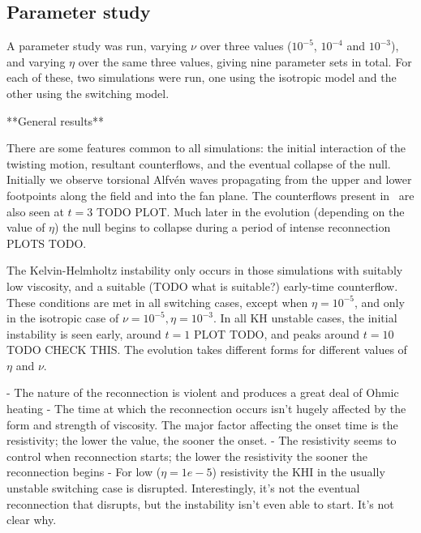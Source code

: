 \subsection{Parameter study}

A parameter study was run, varying $\nu$ over three values ($10^{-5}$, $10^{-4}$ and $10^{-3}$), and varying $\eta$ over the same three values, giving nine parameter sets in total. For each of these, two simulations were run, one using the isotropic model and the other using the switching model.

**General results**

There are some features common to all simulations: the initial interaction of the twisting motion, resultant counterflows, and the eventual collapse of the null. Initially we observe torsional Alfv\'en waves propagating from the upper and lower footpoints along the field and into the fan plane. The counterflows present in~\cite{wyperKelvinHelmholtzInstabilityCurrentvortex2013} are also seen at $t=3$ TODO PLOT. Much later in the evolution (depending on the value of $\eta$) the null begins to collapse during a period of intense reconnection PLOTS TODO.

The Kelvin-Helmholtz instability only occurs in those simulations with suitably low viscosity, and a suitable (TODO what is suitable?) early-time counterflow. These conditions are met in all switching cases, except when $\eta=10^{-5}$, and only in the isotropic case of $\nu = 10^{-5}, \eta=10^{-3}$. In all KH unstable cases, the initial instability is seen early, around $t=1$ PLOT TODO, and peaks around $t=10$ TODO CHECK THIS. The evolution takes different forms for different values of $\eta$ and $\nu$.

- The nature of the reconnection is violent and produces a great deal of Ohmic heating
- The time at which the reconnection occurs isn't hugely affected by the form and strength of viscosity. The major factor affecting the onset time is the resistivity; the lower the value, the sooner the onset.
- The resistivity seems to control when reconnection starts; the lower the resistivity the sooner the reconnection begins
- For low ($\eta=1e-5$) resistivity the KHI in the usually unstable switching case is disrupted. Interestingly, it's not the eventual reconnection that disrupts, but the instability isn't even able to start. It's not clear why.
